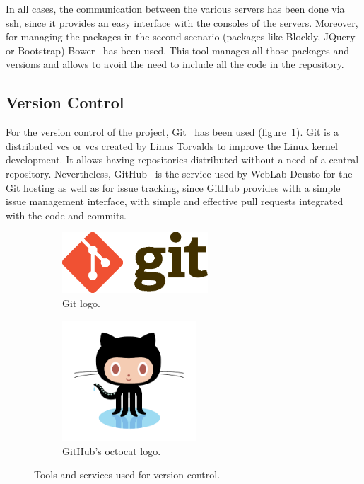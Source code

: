 In all cases, the communication between the various servers has been done via \acrshort{ssh}, since
it provides an easy interface with the consoles of the servers. Moreover, for managing the packages
in the second scenario (packages like Blockly, JQuery or Bootstrap) Bower~\cite{bower} has been
used. This tool manages all those packages and versions and allows to avoid the need to include all
the code in the repository.

\subsection{Version Control}

For the version control of the project, Git~\cite{git_web} has been used (figure~\ref{subfig:git}).
Git is a distributed \acrlong{vcs} or \acrshort{vcs} created by Linus Torvalds to improve the Linux
kernel development. It allows having repositories distributed without a need of a central
repository. Nevertheless, GitHub~\cite{github_web} is the service used by WebLab-Deusto for the Git
hosting as well as for issue tracking, since GitHub provides with a simple issue management
interface, with simple and effective pull requests integrated with the code and commits.

\begin{figure}[!htbp]
	\centering
	\begin{subfigure}{0.6\textwidth}
		\centering
		\includegraphics[width=0.6\textwidth]{fig/git.eps}
		\caption{Git logo.}\label{subfig:git}
	\end{subfigure}\quad
	\begin{subfigure}{0.3\textwidth}
		\centering
		\includegraphics[width=0.55\textwidth]{fig/github}
		\caption{GitHub's octocat logo.}\label{subfig:github}
	\end{subfigure}\quad
	\caption{Tools and services used for version control.}
\end{figure}
